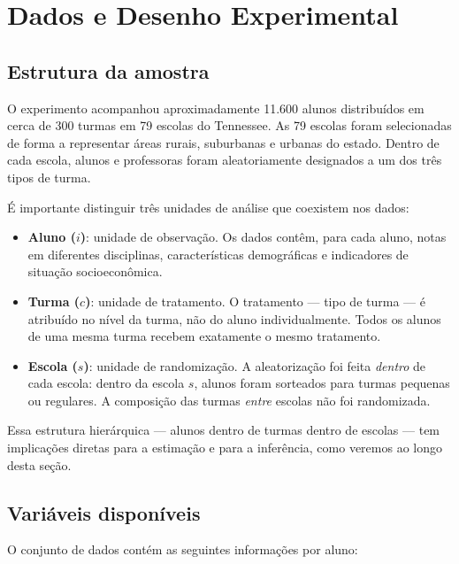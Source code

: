 \section{Dados e Desenho Experimental}
\label{sec:star_dados}

\subsection*{Estrutura da amostra}

O experimento acompanhou aproximadamente 11.600 alunos distribuídos em cerca de 300 turmas em 79 escolas do Tennessee. As 79 escolas foram selecionadas de forma a representar áreas rurais, suburbanas e urbanas do estado. Dentro de cada escola, alunos e professoras foram aleatoriamente designados a um dos três tipos de turma.

É importante distinguir três unidades de análise que coexistem nos dados:

\begin{itemize}[leftmargin=*]
  \item \textbf{Aluno ($i$)}: unidade de observação. Os dados contêm, para cada aluno, notas em diferentes disciplinas, características demográficas e indicadores de situação socioeconômica.
  \item \textbf{Turma ($c$)}: unidade de tratamento. O tratamento --- tipo de turma --- é atribuído no nível da turma, não do aluno individualmente. Todos os alunos de uma mesma turma recebem exatamente o mesmo tratamento.
  \item \textbf{Escola ($s$)}: unidade de randomização. A aleatorização foi feita \textit{dentro} de cada escola: dentro da escola $s$, alunos foram sorteados para turmas pequenas ou regulares. A composição das turmas \textit{entre} escolas não foi randomizada.
\end{itemize}

Essa estrutura hierárquica --- alunos dentro de turmas dentro de escolas --- tem implicações diretas para a estimação e para a inferência, como veremos ao longo desta seção.

\subsection*{Variáveis disponíveis}

O conjunto de dados contém as seguintes informações por aluno:

